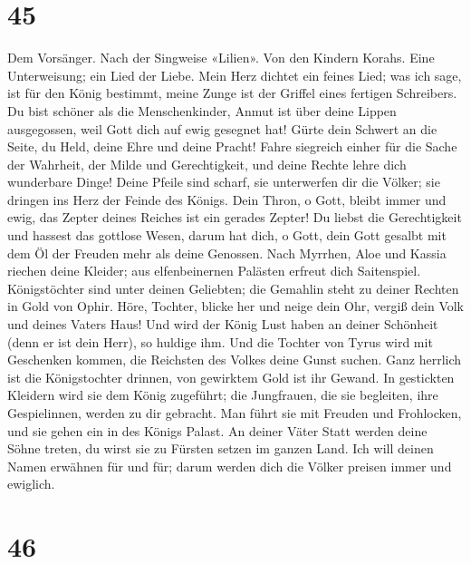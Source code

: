 \hypertarget{section-44}{%
\section{45}\label{section-44}}

 Dem Vorsänger. Nach der Singweise «Lilien». Von den
Kindern Korahs. Eine Unterweisung; ein Lied der Liebe. Mein Herz dichtet
ein feines Lied; was ich sage, ist für den König bestimmt, meine Zunge
ist der Griffel eines fertigen Schreibers.  Du bist
schöner als die Menschenkinder, Anmut ist über deine Lippen ausgegossen,
weil Gott dich auf ewig gesegnet hat!  Gürte dein Schwert
an die Seite, du Held, deine Ehre und deine Pracht!  Fahre
siegreich einher für die Sache der Wahrheit, der Milde und
Gerechtigkeit, und deine Rechte lehre dich wunderbare Dinge!
 Deine Pfeile sind scharf, sie unterwerfen dir die Völker;
sie dringen ins Herz der Feinde des Königs.  Dein Thron, o
Gott, bleibt immer und ewig, das Zepter deines Reiches ist ein gerades
Zepter!  Du liebst die Gerechtigkeit und hassest das
gottlose Wesen, darum hat dich, o Gott, dein Gott gesalbt mit dem Öl der
Freuden mehr als deine Genossen.  Nach Myrrhen, Aloe und
Kassia riechen deine Kleider; aus elfenbeinernen Palästen erfreut dich
Saitenspiel.  Königstöchter sind unter deinen Geliebten;
die Gemahlin steht zu deiner Rechten in Gold von Ophir. 
Höre, Tochter, blicke her und neige dein Ohr, vergiß dein Volk und
deines Vaters Haus!  Und wird der König Lust haben an
deiner Schönheit (denn er ist dein Herr), so huldige ihm.
 Und die Tochter von Tyrus wird mit Geschenken kommen,
die Reichsten des Volkes deine Gunst suchen.  Ganz
herrlich ist die Königstochter drinnen, von gewirktem Gold ist ihr
Gewand.  In gestickten Kleidern wird sie dem König
zugeführt; die Jungfrauen, die sie begleiten, ihre Gespielinnen, werden
zu dir gebracht.  Man führt sie mit Freuden und
Frohlocken, und sie gehen ein in des Königs Palast.  An
deiner Väter Statt werden deine Söhne treten, du wirst sie zu Fürsten
setzen im ganzen Land.  Ich will deinen Namen erwähnen
für und für; darum werden dich die Völker preisen immer und ewiglich.

\hypertarget{section-45}{%
\section{46}\label{section-45}}

